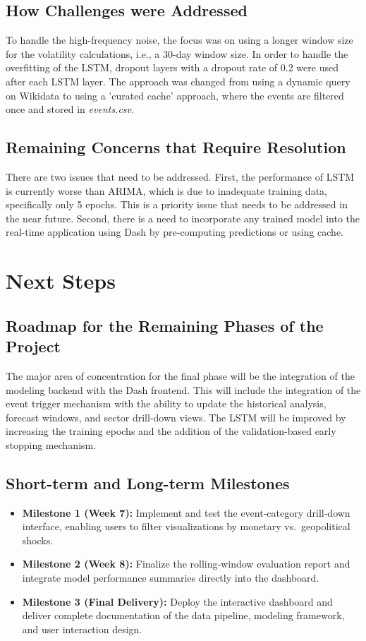 \documentclass{article}
\begin{document}
\subsection{How Challenges were Addressed}
To handle the high-frequency noise, the focus was on using a longer window size for the volatility calculations, i.e., a 30-day window size. In order to handle the overfitting of the LSTM, dropout layers with a dropout rate of 0.2 were used after each LSTM layer. The approach was changed from using a dynamic query on Wikidata to using a 'curated cache' approach, where the events are filtered once and stored in \textit{events.csv}.

\subsection{Remaining Concerns that Require Resolution}
There are two issues that need to be addressed. First, the performance of LSTM is currently worse than ARIMA, which is due to inadequate training data, specifically only 5 epochs. This is a priority issue that needs to be addressed in the near future. Second, there is a need to incorporate any trained model into the real-time application using Dash by pre-computing predictions or using cache.

\section{Next Steps}

\subsection{Roadmap for the Remaining Phases of the Project}
The major area of concentration for the final phase will be the integration of the modeling backend with the Dash frontend. This will include the integration of the event trigger mechanism with the ability to update the historical analysis, forecast windows, and sector drill-down views. The LSTM will be improved by increasing the training epochs and the addition of the validation-based early stopping mechanism.

\subsection{Short-term and Long-term Milestones}
\begin{itemize}
    \item \textbf{Milestone 1 (Week 7):} Implement and test the event‑category drill‑down interface, enabling users to filter visualizations by monetary vs.\ geopolitical shocks.
    \item \textbf{Milestone 2 (Week 8):} Finalize the rolling‑window evaluation report and integrate model performance summaries directly into the dashboard.
    \item \textbf{Milestone 3 (Final Delivery):} Deploy the interactive dashboard and deliver complete documentation of the data pipeline, modeling framework, and user interaction design.
\end{itemize}
\end{document}
